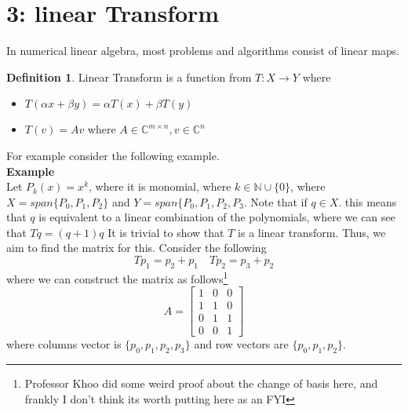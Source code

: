 \documentclass[11pt]{article}
\theoremstyle{definition}
\newtheorem{definition}{Definition}[section]
\newcommand{\N}{\mathbb{N}}
\newcommand{\C}{\mathbb{C}}
\begin{document}
\section{3: linear Transform}
In numerical linear algebra, most problems and algorithms consist of linear maps. 
\begin{definition}
  Linear Transform is a function from $T: X \to Y$ where
  \begin{itemize}
    \item $T(\alpha x + \beta y) = \alpha T(x) + \beta T(y)$ 
    \item $T(v) = Av$ where $A \in \C^{m \times n}, v \in \C^n$
  \end{itemize}
\end{definition}
For example consider the following example. \\
\textbf{Example}\\
Let $P_k(x) = x^k$, where it is monomial, where $k \in \N \cup \{ 0\}$, where $X = span \{ P_0, P_1, P_2\}$ and $Y = span \{P_0, P_1, P_2, P_3$. Note that if $q \in X$. this means that $q$ is equivalent to a linear combination of the polynomials, where we can see that $Tq = (q + 1)q$ It is trivial to show that $T$ is a linear transform. Thus, we aim to find the matrix for this. Consider the following
\[
Tp_1 = p_2 + p_1 \quad Tp_2 = p_3 + p_2
\] 
where we can construct the matrix as follows\footnote{Professor Khoo did some weird proof about the change of basis here, and frankly I don't think its worth putting here as an FYI}
\[
A = \begin{bmatrix}
  1 & 0 & 0\\
  1 & 1 & 0 \\
  0 & 1 & 1\\
  0 & 0 & 1
\end{bmatrix}
\]
where columns vector is $\{p_0, p_1, p_2, p_3\}$ and row vectors are $\{p_0, p_1, p_2\}$. 
\end{document}
